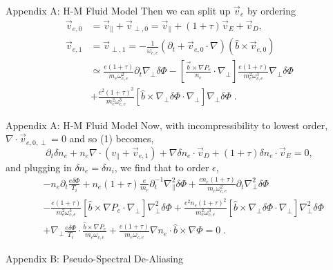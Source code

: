 \documentclass[aspectratio=43]{beamer}
\begin{document}
   \begin{frame}{Appendix A: H-M Fluid Model}
      \quad Then we can split up $\vec{v}_e$ by ordering
      \begin{equation}
      \begin{aligned}
         \vec{v}_{e,0} &= \vec{v}_{\parallel} + \vec{v}_{\perp,0} = \vec{v}_{\parallel} + \left(1 + \tau\right)\vec{v}_E + \vec{v}_D,  \\
         \vec{v}_{e,1} &= \vec{v}_{\perp,1} = -\frac{1}{\omega_{c,e}}(\partial_t+\vec{v}_{e,0}\cdot\nabla)(\hat{b}\times\vec{v}_{e,0}) \\
                       &\simeq \frac{e(1+\tau)}{m_e\omega_{c,e}^2}\partial_t\nabla_{\perp}\delta\Phi - [\frac{\vec{b}\times\nabla P_e}{n_e}\cdot\nabla_{\perp}]
                               \frac{e(1+\tau)}{m_e^2\omega_{c,e}^3}\nabla_{\perp}\delta\Phi \\
                       &+      \frac{e^2(1+\tau)^2}{m_e^2\omega_{c,e}^3}[\hat{b}\times\nabla_{\perp}\delta\Phi\cdot\nabla_{\perp}]\nabla_{\perp}\delta\Phi\;.
      \end{aligned}
      \end{equation}
   \end{frame}

   \begin{frame}{Appendix A: H-M Fluid Model}
      \quad Now, with incompressibility to lowest order, $\nabla\cdot\vec{v}_{e,0,\perp}=0$ and so (1) becomes,
      \begin{equation}
         \partial_t\delta n_e+n_e\nabla\cdot(v_{\parallel} + \vec{v}_{e,1}) + \nabla\delta n_e\cdot\vec{v}_D+(1+\tau)\delta n_e\cdot\vec{v}_E = 0,
      \end{equation}
      and plugging in $\delta n_e=\delta n_i$, we find that to order $\epsilon$,
      \vspace{-2mm}
      \begin{equation}
      \begin{aligned}
         &-n_e\partial_t\frac{e\delta\Phi}{T_i} + n_e(1+\tau)\frac{e}{m_e}\partial_t^{-1}\nabla_{\parallel}^2\delta\Phi
         + \frac{en_e(1+\tau)}{m_e\omega_{c,e}^2}\partial_t\nabla_{\perp}^2\delta\Phi \\
         &- \frac{e(1+\tau)}{m_e^2\omega_{c,e}^3}[\hat{b}\times\nabla P_e\cdot\nabla_{\perp}]\nabla_{\perp}^2\delta\Phi
         + \frac{e^2n_e(1+\tau)^2}{m_e^2\omega_{c,e}^3}[\hat{b}\times\nabla_{\perp}\delta\Phi\cdot\nabla_{\perp}]\nabla_{\perp}^2\delta\Phi \\
         &+ \nabla_{\perp}\frac{e\delta\Phi}{T_i}\cdot\frac{\hat{b}\times\nabla P_e}{m_e\omega_{c,e}} + \frac{e(1+\tau)}{m_e\omega_{c,e}}\nabla n_e\cdot\hat{b}\times\nabla\Phi = 0\;.
      \end{aligned}
      \end{equation}
   \end{frame}

   \begin{frame}{Appendix B: Pseudo-Spectral De-Aliasing}
   \end{frame}
\end{document}
